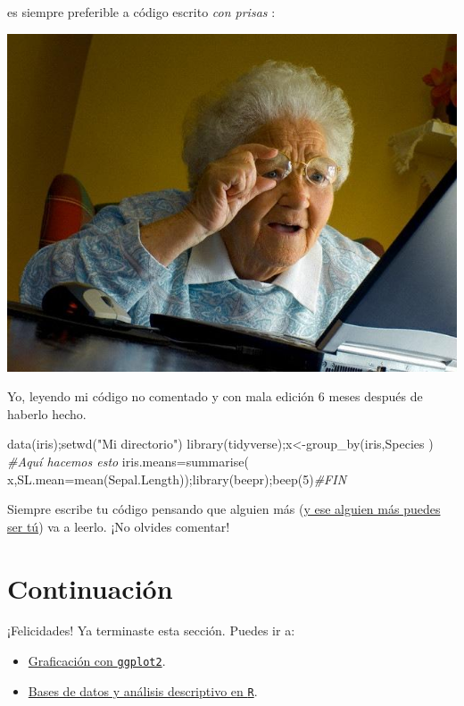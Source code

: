 \documentclass[]{tufte-book}
\newenvironment{Shaded}{}{}
\newcommand{\AttributeTok}[1]{\textcolor[rgb]{0.49,0.56,0.16}{#1}}
\newcommand{\CommentTok}[1]{\textcolor[rgb]{0.38,0.63,0.69}{\textit{#1}}}
\newcommand{\DecValTok}[1]{\textcolor[rgb]{0.25,0.63,0.44}{#1}}
\newcommand{\FunctionTok}[1]{\textcolor[rgb]{0.02,0.16,0.49}{#1}}
\newcommand{\NormalTok}[1]{#1}
\newcommand{\OtherTok}[1]{\textcolor[rgb]{0.00,0.44,0.13}{#1}}
\newcommand{\StringTok}[1]{\textcolor[rgb]{0.25,0.44,0.63}{#1}}
\providecommand{\tightlist}{%
  \setlength{\itemsep}{0pt}\setlength{\parskip}{0pt}}
\begin{document}
es siempre preferible a código escrito \emph{con prisas} :

\begin{marginfigure}
\includegraphics[width=8.89in]{images/Grandma-Finds-The-Internet} \caption[Yo, leyendo mi código no comentado y con mala edición 6 meses después de haberlo hecho]{Yo, leyendo mi código no comentado y con mala edición 6 meses después de haberlo hecho.}\label{fig:unnamed-chunk-98}
\end{marginfigure}

\begin{Shaded}
\begin{Highlighting}[]
\FunctionTok{data}\NormalTok{(iris);}\FunctionTok{setwd}\NormalTok{(}\StringTok{"Mi directorio"}\NormalTok{)}
\FunctionTok{library}\NormalTok{(tidyverse);x}\OtherTok{\textless{}{-}}\FunctionTok{group\_by}\NormalTok{(iris,Species  )}
\CommentTok{\#Aquí hacemos esto}
\NormalTok{iris.means}\OtherTok{=}\FunctionTok{summarise}\NormalTok{( x,}\AttributeTok{SL.mean=}\FunctionTok{mean}\NormalTok{(Sepal.Length));}\FunctionTok{library}\NormalTok{(beepr);}\FunctionTok{beep}\NormalTok{(}\DecValTok{5}\NormalTok{)}\CommentTok{\#FIN}
\end{Highlighting}
\end{Shaded}

Siempre escribe tu código pensando que alguien más
(\href{https://www.redaccionmedica.com/virico/noticias/el-gato-de-schrodinger-y-por-que-no-abrir-la-puerta-cerrada-de-la-consulta-5188}{y
ese alguien más puedes ser tú}) va a leerlo. ¡No olvides comentar!

\hypertarget{continuaciuxf3n}{%
\section{Continuación}\label{continuaciuxf3n}}

¡Felicidades! Ya terminaste esta sección. Puedes ir a:

\begin{itemize}
\tightlist
\item
  \href{Graficación_con_gglot2.html}{Graficación con \texttt{ggplot2}}.
\item
  \href{Estadística_Descriptiva.html}{Bases de datos y análisis
  descriptivo en \texttt{R}}.
\end{itemize}


\end{document}
